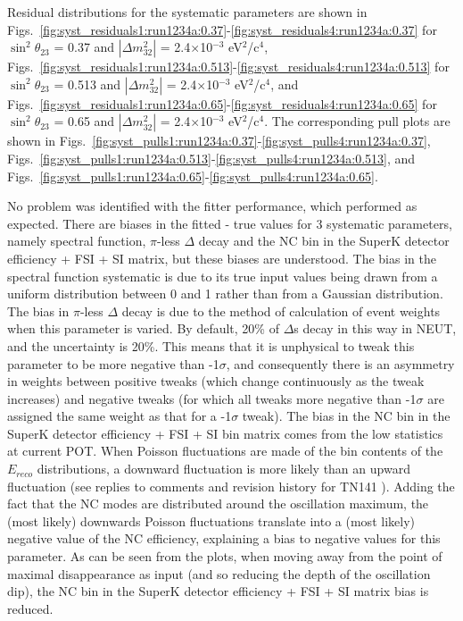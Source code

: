 Residual distributions for the systematic parameters are shown in
Figs.\ \ref{fig:syst_residuals1:run1234a:0.37}-\ref{fig:syst_residuals4:run1234a:0.37} for
$\sin^{2}\theta_{23}$ = 0.37 and $|\Delta m^{2}_{32}|$ = 2.4$\times$10$^{-3}$ eV$^{2}$/c$^{4}$,
Figs.\ \ref{fig:syst_residuals1:run1234a:0.513}-\ref{fig:syst_residuals4:run1234a:0.513} for
$\sin^{2}\theta_{23}$ = 0.513 and $|\Delta m^{2}_{32}|$ = 2.4$\times$10$^{-3}$ eV$^{2}$/c$^{4}$,
and
Figs.\ \ref{fig:syst_residuals1:run1234a:0.65}-\ref{fig:syst_residuals4:run1234a:0.65} for
$\sin^{2}\theta_{23}$ = 0.65 and $|\Delta m^{2}_{32}|$ = 2.4$\times$10$^{-3}$ eV$^{2}$/c$^{4}$.
The corresponding pull plots are shown in
Figs.\ \ref{fig:syst_pulls1:run1234a:0.37}-\ref{fig:syst_pulls4:run1234a:0.37},
Figs.\ \ref{fig:syst_pulls1:run1234a:0.513}-\ref{fig:syst_pulls4:run1234a:0.513}, and
Figs.\ \ref{fig:syst_pulls1:run1234a:0.65}-\ref{fig:syst_pulls4:run1234a:0.65}.


No problem was identified with the fitter performance, which performed as expected.
There are biases in the fitted - true values for 3 systematic parameters, namely spectral function, $\pi$-less 
$\Delta$ decay and the NC bin in the SuperK detector efficiency + FSI + SI matrix,
but these biases are understood. The bias in the spectral function 
systematic is due to its true input values being drawn from a uniform distribution between 0 and 1 rather than 
from a Gaussian distribution. The bias in $\pi$-less $\Delta$ decay is due to the method of calculation of event 
weights when this parameter is varied. By default, 20\% of $\Delta$s decay in this way in NEUT, and the uncertainty 
is 20\%. This means that it is unphysical to tweak this parameter to be more negative than -1$\sigma$, and 
consequently there is an asymmetry in weights between positive tweaks (which change continuously as the tweak 
increases) and negative tweaks (for which all tweaks more negative than -1$\sigma$ are assigned the same weight 
as that for a -1$\sigma$ tweak). The bias in the NC bin in the SuperK detector efficiency + FSI + SI bin matrix
comes from the low statistics at current POT.
When Poisson fluctuations are made of the bin contents of the $E_{reco}$ distributions, a downward fluctuation is more likely than an upward
fluctuation (see replies to comments and revision history for TN141 \cite{OurRun123DisappAnalysis3Flavour}).
Adding the fact that the NC modes are distributed around the oscillation maximum, the (most likely) downwards Poisson fluctuations translate into a (most likely)
negative value of the NC efficiency, explaining a bias to negative values for this parameter.
As can be seen from the plots, when moving away from the point of maximal disappearance as input
(and so reducing the depth of the oscillation dip),
the NC bin in the SuperK detector efficiency + FSI + SI matrix bias is reduced.

